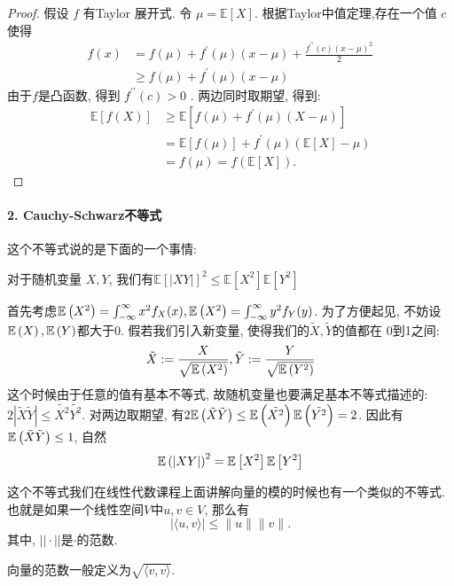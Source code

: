 \begin{proof}
    假设 $f$ 有Taylor 展开式. 令 $\mu=\mathbb{E}[X]$. 根据Taylor中值定理,存在一个值 $c$ 使得
$$
\begin{aligned}
f(x) & =f(\mu)+f^{\prime}(\mu)(x-\mu)+\frac{f^{\prime \prime}(c)(x-\mu)^2}{2} \\
& \geq f(\mu)+f^{\prime}(\mu)(x-\mu)
\end{aligned}
$$
由于$f$是凸函数, 得到 $f^{\prime \prime}(c)>0$ . 两边同时取期望, 得到: 
$$
\begin{aligned}
\mathbb{E}[f(X)] & \geq \mathbb{E}\left[f(\mu)+f^{\prime}(\mu)(X-\mu)\right] \\
& =\mathbb{E}[f(\mu)]+f^{\prime}(\mu)(\mathbb{E}[X]-\mu) \\
& =f(\mu)=f(\mathbb{E}[X]) .
\end{aligned}
$$
\end{proof}

\paragraph{2. Cauchy-Schwarz不等式}
这个不等式说的是下面的一个事情: 


对于随机变量  $ X, Y $, 我们有$ \mathbb{E}[|X Y|]^2 \leq \mathbb{E}\left[X^2\right] \mathbb{E}\left[Y^2\right]$
    
  
    
    首先考虑$\mathbb E\left(X^2\right) = \int_{-\infty}^{\infty} x^2 f_X(x), \mathbb E\left(X^2\right) = \int_{-\infty}^{\infty} y^2 f_Y(y)$. 为了方便起见, 不妨设$\mathbb E\left(X\right), \mathbb E\left(Y\right)$都大于0. 假若我们引入新变量, 使得我们的$\tilde{X}, \tilde{Y}$的值都在 0到1之间: 
    $$
    \tilde{X}:= \frac{X}{\sqrt{\mathbb E\left(X^2\right)}},\tilde{Y}:= \frac{Y}{\sqrt{\mathbb E\left(Y^2\right)}} 
    $$
    这个时候由于任意的值有基本不等式, 故随机变量也要满足基本不等式描述的: $2|\tilde{X}\tilde{Y}|\leq \tilde{X^2}\tilde{Y^2}$. 对两边取期望, 有$2\mathbb E\left(\tilde{X}\tilde{Y}\right)\leq \mathbb E\left(\tilde{X^2}\right)\mathbb E\left(\tilde{Y^2}\right)=2$. 因此有$\mathbb E\left(\tilde{X}\tilde{Y}\right)\leq 1$, 自然
    $$
        \mathbb E\left(|X Y|\right)^2 = \mathbb{E}\left[X^2\right] \mathbb{E}\left[Y^2\right]
    $$ 

    \begin{asidebox}
        这个不等式我们在线性代数课程上面讲解向量的模的时候也有一个类似的不等式. 也就是如果一个线性空间$V$中$u,v\in V$, 那么有
        $$
        |\langle u, v\rangle| \leq\|u\|\|v\|.
        $$
        其中, $||\cdot||$是$\cdot$的范数. 

        向量的范数一般定义为$\sqrt{\langle v, v\rangle}$. 
    \end{asidebox}

